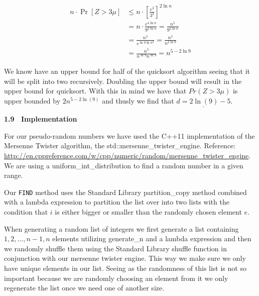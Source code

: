 \documentclass[article,a4paper,oneside]{article}
\newcommand{\+}[1]{\ensuremath{\boldsymbol{#1}}}
\begin{document}
\begin{align*}
n\cdot \Pr[Z>3\mu] &\leq n\cdot \left [ \frac{e^2}{3^2} \right ]^{2\ln n}\\
&=n\cdot\frac{e^{4\ln n}}{9^{2\ln n}} =\frac{n^5}{9^{2\ln n}}\\
&=\frac{n^5}{e^{\ln 9 \ln n^2}} =\frac{n^5}{n^{2\ln 9}}\\
&=\frac{n^5}{n^{\ln 9}n^{\ln 9}} =n^{5-2\ln 9}
\end{align*}

We know have an upper bound for half of the quicksort algorithm seeing that it will be split into two recursively. Doubling the upper bound will result in the upper bound for quicksort. With this in mind we have that $Pr(Z > 3\mu)$ is upper bounded by $2n^{5-2\ln(9)}$ and thusly we find that $\underline{d = 2\ln(9) - 5}$.


{\bf 1.9 \ Implementation}

For our pseudo-random numbers we have used the C++11 implementation of the Mersenne Twister algorithm, the std::mersenne\_twister\_engine. Reference: \url{ http://en.cppreference.com/w/cpp/numeric/random/mersenne_twister_engine}. We are using a uniform\_int\_distribution to find a random number in a given range. 

Our \texttt{FIND} method uses the Standard Library partition\_copy method combined with a lambda expression to partition the list over into two lists with the condition that $i$ is either bigger or smaller than the randomly chosen element $e$.

When generating a random list of integers we first generate a list containing $1,2,\ldots, n-1,n$ elements utilizing generate\_n and a lambda expression and then we randomly shuffle them using the Standard Library shuffle function in conjunction with our mersenne twister engine. This way we make sure we only have unique elements in our list. Seeing as the randomness of this list is not so important because we are randomly choosing an element from it we only regenerate the list once we need one of another size.

\end{document}
